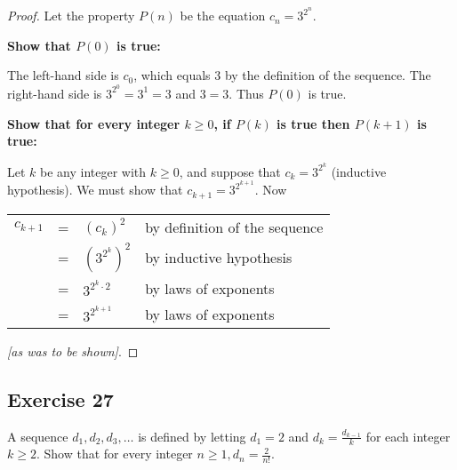 \documentclass[14pt]{extarticle}
\newcommand{\dps}{\displaystyle}
\newcommand{\cy}{\color{cyan}}
\begin{document}
\begin{proof}
    Let the property $P(n)$ be the equation $\dps c_n = 3^{2^n}$.

        {\bf Show that $P(0)$ is true:}

    The left-hand side is $c_0$, which equals 3 by the definition of the sequence. The right-hand side is $\dps 3^{2^0} = 3^1 = 3$ and $3 = 3$. Thus $P(0)$ is true.

        {\bf Show that for every integer $k \geq 0$, if $P(k)$ is true then $P(k + 1)$ is true:}

    Let $k$ be any integer with $k \geq 0$, and suppose that $\dps c_k = 3^{2^k}$ ({\cy inductive hypothesis}). We must show that $c_{k + 1} = 3^{2^{k+1}}$. Now

    \begin{center}
        \begin{tabular}{rlll}
            $c_{k+1}$ & = & $(c_k)^2$          & {\cy by definition of the sequence} \\
                      & = & $\dps (3^{2^k})^2$ & {\cy by inductive hypothesis}       \\
                      & = & $3^{2^k \cdot 2}$  & {\cy by laws of exponents}          \\
                      & = & $3^{2^{k + 1}}$    & {\cy by laws of exponents}
        \end{tabular}
    \end{center}

    {\it [as was to be shown]}.
\end{proof}

\subsection{Exercise 27}
A sequence $d_1, d_2, d_3, \ldots$ is defined by letting $d_1 = 2$ and $\dps d_k = \frac{d_{k-1}}{k}$ for each integer $k \geq 2$. Show that for every integer $\dps n \geq 1, d_n = \frac{2}{n!}$.
\end{document}
